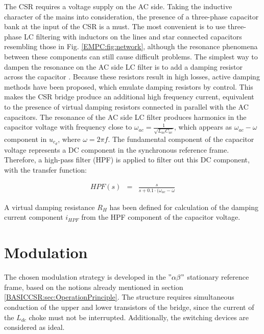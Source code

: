     The CSR requires a voltage supply on the AC side. Taking the inductive character of the mains into consideration, the presence of a three-phase capacitor bank at the input of the CSR is a must. The most convenient is to use three-phase LC filtering with inductors on the lines and star connected capacitors resembling those in Fig. \ref{EMPC:fig:network}, although the resonance phenomena between these components can still cause difficult problems. The simplest way to dampen the resonance on the AC side LC filter is to add a damping resistor across the capacitor \cite{regaya2014new}. Because these resistors result in high losses, active damping methods have been proposed, which emulate damping resistors by control. This makes the CSR bridge produce an additional high frequency current, equivalent to the presence of virtual damping resistors connected in parallel with the AC capacitors. The resonance of the AC side LC filter produces harmonics in the capacitor voltage with frequency close to $\omega_{ac}=\frac{1}{\sqrt{L_{ac}C_{ac}}}$, which appears as $\omega_{ac}-\omega$ component in $u_{c_d}$, where $\omega=2\pi f$. The fundamental component of the capacitor voltage represents a DC component in the synchronous reference frame. Therefore, a high-pass filter (HPF) is applied to filter out this DC component, with the transfer function:

    \begin{equation}
        \begin{array}{rcl}
            HPF(s)&=&\frac{s}{s+0.1\cdot(\omega_{ac}-\omega}
        \end{array}
        \label{EMPC:equ:AC_HPF}
    \end{equation}

    A virtual damping resistance $R_H$ has been defined for calculation of the damping current component $i_{HPF}$ from the HPF component of the capacitor voltage.

\section{Modulation}\label{EMPC:sec:Modulation}

    The chosen modulation strategy is developed in the $"\alpha\beta"$ stationary reference frame, based on the notions already mentioned in section \ref{BASICCSR:sec:OperationPrinciple}. The structure requires simultaneous conduction of the upper and lower transistors of the bridge, since the current of the $L_{dc}$  choke must not be interrupted. Additionally, the switching devices are considered as ideal.


